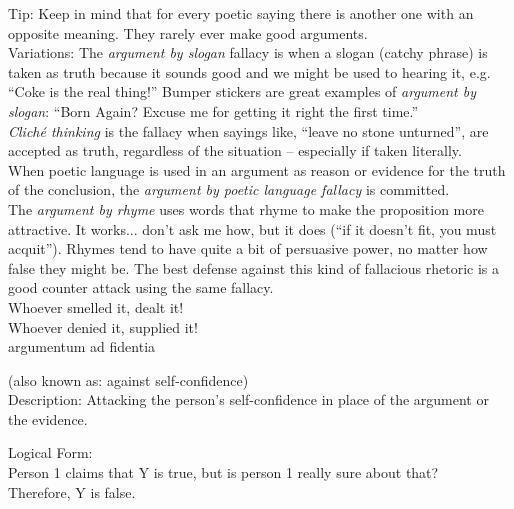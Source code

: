 \documentclass[a4paper,12pt,single,pdftex]{scrartcl}
\begin{document}
    
      Tip: Keep in mind that for every poetic saying there is another one with an opposite meaning.  They rarely ever make good arguments.
    \\

    
      Variations: The {\it argument by slogan} fallacy is when a slogan (catchy phrase) is taken as truth because it sounds good and we might be used to hearing it, e.g. “Coke is the real thing!”  Bumper stickers are great examples of {\it argument by slogan}: “Born Again? Excuse me for getting it right the first time.”
    \\

    
      {\it Cliché thinking} is the fallacy when sayings like, “leave no stone unturned”, are accepted as truth, regardless of the situation -- especially if taken literally.
    \\

    
      When poetic language is used in an argument as reason or evidence for the truth of the conclusion, the {\it argument by poetic language fallacy}  is committed.
    \\

    
      The {\it argument by rhyme} uses words that rhyme to make the proposition more attractive.  It works... don’t ask me how, but it does (“if it doesn’t fit, you must acquit”).  Rhymes tend to have quite a bit of persuasive power, no matter how false they might be.  The best defense against this kind of fallacious rhetoric is a good counter attack using the same fallacy.
    \\

    
      Whoever smelled it, dealt it!
    \\

    
      Whoever denied it, supplied it!
    \\

  

argumentum ad fidentia
    
      (also known as: against self-confidence)
    \\

  
    Description: Attacking the person’s self-confidence in place of the argument or the evidence.

    
      Logical Form:
    \\

    
      Person 1 claims that Y is true, but is person 1 really sure about that?
    \\

    
      Therefore, Y is false.
    \\
\end{document}
